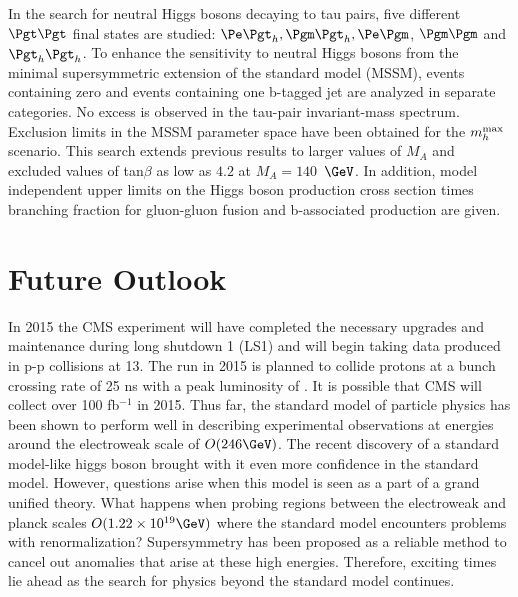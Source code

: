 In the search for neutral Higgs bosons decaying to tau pairs, five different $\Pgt\Pgt$ final states are studied: 
$\Pe\Pgt_{h}, \Pgm\Pgt_{h}, \Pe\Pgm$, $\Pgm\Pgm$ and $\Pgt_{h}\Pgt_{h}$. 
To enhance the sensitivity to neutral Higgs bosons 
from the minimal supersymmetric extension of the standard model (MSSM), 
events containing zero and events containing one b-tagged jet are analyzed in separate categories.
No excess is observed in the tau-pair invariant-mass spectrum. 
Exclusion limits in the MSSM parameter space have been obtained 
for the $m_h^{\rm max}$ scenario. This search extends previous 
results to larger values of $M_A$ and excluded values of tan$\beta$ 
as low as $4.2$ at $M_A=140$~$\GeV$. 
In addition, model independent upper limits on the Higgs boson production cross 
section times branching fraction for gluon-gluon fusion and b-associated 
production are given.

\section{Future Outlook}
In 2015 the CMS experiment will have completed the necessary upgrades and 
maintenance during long shutdown 1 (LS1) and 
will begin taking data produced in p-p collisions at 13\TeV. The run
in 2015 is planned to collide protons at a bunch crossing rate of 25 ns 
with a peak luminosity of .%
It is possible that CMS will collect over 100 fb$^{-1}$ in 2015. 
Thus far, the standard model of particle physics has been
shown to perform well in describing experimental observations at energies around
the electroweak scale of $O(246 \GeV)$.
The recent discovery of a standard model-like higgs boson brought with it
even more confidence in the standard model. However, questions arise when this model is seen as 
a part of a grand unified theory. What happens when probing
regions between the electroweak and planck scales $O(1.22 \times10^{19} \GeV)$ where
the standard model encounters problems with renormalization?
Supersymmetry has been proposed as a reliable method to 
cancel out anomalies that arise at these high energies. 
Therefore, exciting times lie ahead as the search for physics beyond the standard model 
continues. 